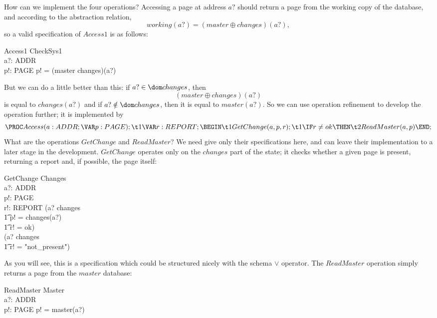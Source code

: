 How can we implement the four operations? Accessing a page
at address $a?$ should return a page from the working copy of the
database, and according to the abstraction relation,
\[ working(a?) = (master \oplus changes)(a?), \]
so a valid specification of $Access1$ is as follows:
\begin{schema}{Access1}
	\Xi CheckSys1 \\
	a?: ADDR \\
	p!: PAGE
\where
	p! = (master \oplus changes)(a?)
\end{schema}
But we can do a little better than this:
if $a? \in \dom changes$, then
\[ (master \oplus changes)(a?) \]
is equal to $changes(a?)$ and if $a? \notin \dom changes$, then it
is equal to $master(a?)$.
So we can use operation refinement to develop the operation further; it is
implemented by
\[
	\PROC Access(a: ADDR; \VAR p: PAGE); \\
\t1		\VAR r: REPORT; \\
	\BEGIN \\
\t1		GetChange(a, p, r); \\
\t1		\IF r \ne ok \THEN \\
\t2			ReadMaster(a, p) \\
	\END;
\]
What are the operations $GetChange$ and $ReadMaster$? We need give only
their specifications here, and can leave their implementation to a
later stage in the development.
$GetChange$ operates only on the $changes$ part of the state;
it checks whether a given page is present,
returning a report and, if possible, the page itself:
\begin{schema}{GetChange}
	\Xi Changes \\
	a?: ADDR \\
	p!: PAGE \\
	r!: REPORT
\where
	(a? \in \dom changes \land \\
\t1		p! = changes(a?) \land \\
\t1		r! = ok) \lor \\
	(a? \notin \dom changes \land \\
\t1		r! = "not\_present")
\end{schema}
As you will see, this is a specification which could be structured nicely
with the schema $\lor$ operator.
The $ReadMaster$ operation simply returns a page from the $master$ database:
\begin{schema}{ReadMaster}
	\Xi Master \\
	a?: ADDR \\
	p!: PAGE
\where
	p! = master(a?)
\end{schema}
